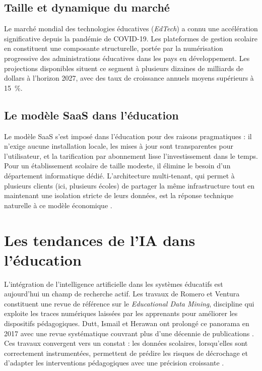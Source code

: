 \documentclass[12pt,a4paper,oneside]{report}
\begin{document}
\subsection{Taille et dynamique du marché}

Le marché mondial des technologies éducatives (\textit{EdTech}) a connu une accélération significative depuis la pandémie de COVID-19. Les plateformes de gestion scolaire en constituent une composante structurelle, portée par la numérisation progressive des administrations éducatives dans les pays en développement. Les projections disponibles situent ce segment à plusieurs dizaines de milliards de dollars à l'horizon 2027, avec des taux de croissance annuels moyens supérieurs à 15~\%.

\subsection{Le modèle SaaS dans l'éducation}

Le modèle \ac{SaaS} s'est imposé dans l'éducation pour des raisons pragmatiques : il n'exige aucune installation locale, les mises à jour sont transparentes pour l'utilisateur, et la tarification par abonnement lisse l'investissement dans le temps. Pour un établissement scolaire de taille modeste, il élimine le besoin d'un département informatique dédié. L'architecture multi-tenant, qui permet à plusieurs clients (ici, plusieurs écoles) de partager la même infrastructure tout en maintenant une isolation stricte de leurs données, est la réponse technique naturelle à ce modèle économique \autocite{walraven2011comparing}.

\section{Les tendances de l'IA dans l'éducation}

L'intégration de l'intelligence artificielle dans les systèmes éducatifs est aujourd'hui un champ de recherche actif. Les travaux de Romero et Ventura \autocite{romero2010educational} constituent une revue de référence sur le \textit{Educational Data Mining}, discipline qui exploite les traces numériques laissées par les apprenants pour améliorer les dispositifs pédagogiques. Dutt, Ismail et Herawan ont prolongé ce panorama en 2017 avec une revue systématique couvrant plus d'une décennie de publications \autocite{dutt2017systematic}. Ces travaux convergent vers un constat : les données scolaires, lorsqu'elles sont correctement instrumentées, permettent de prédire les risques de décrochage et d'adapter les interventions pédagogiques avec une précision croissante \autocite{albreiki2021systematic}.
\end{document}
